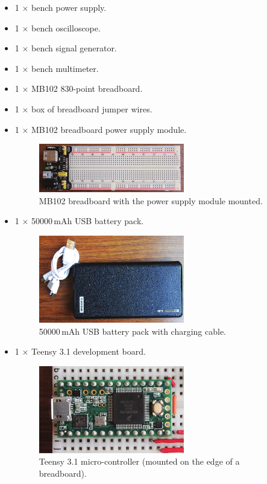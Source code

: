 \documentclass[letterpaper, 11pt]{article}
\begin{document}
\begin{itemize}[itemsep=0.5ex]
\item 1 $\times$ bench power supply.
\item 1 $\times$ bench oscilloscope.
\item 1 $\times$ bench signal generator.
\item 1 $\times$ bench multimeter.
\item 1 $\times$ MB102 830-point breadboard.	
\item 1 $\times$ box of breadboard jumper wires.
\item 1 $\times$ MB102 breadboard power supply module.	
	\begin{figure}[h]
		\centering
		\includegraphics[width=2.5in]{breadboard-pic}
		\caption{MB102 breadboard with the power supply module mounted.}
		\label{fig:breadboard-pic}
	\end{figure}
\item 1 $\times$ \num{50000}\,mAh USB battery pack.
	\begin{figure}[h]
		\centering
		\includegraphics[width=2.5in]{battery-pic}
		\caption{\num{50000}\,mAh USB battery pack with charging cable.}
		\label{fig:battery-pic}
	\end{figure}
\item 1 $\times$ Teensy 3.1 development board.	
	\begin{figure}[h]
		\centering
		\includegraphics[width=2.5in]{teensy-pic}
		\caption{Teensy 3.1 micro-controller (mounted on the edge of a breadboard).}

\end{figure}
\end{itemize}
\end{document}

